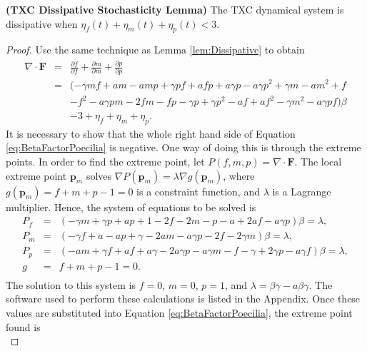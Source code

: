 	\begin{lemma}\label{lem:DissipativePoecilia} \textbf{(TXC Dissipative Stochasticity Lemma)}
		The TXC dynamical system is dissipative when $\eta_f(t)+\eta_m(t)+\eta_p(t)<3$.
	\end{lemma}
	\begin{proof} 
	Use the same technique as Lemma \ref{lem:Dissipative} to obtain	
	\begin{eqnarray}
		 \nabla \cdot \textbf{F}&=&\frac{\partial\dot{f}}{\partial f}+\frac{\partial \dot{m}}{\partial m}+\frac{\partial\dot{p}}{\partial p}\nonumber\\
		 												&=& (-{\gamma}mf+am-amp+{\gamma}pf+afp+a{\gamma}p-a{\gamma}{p}^{2}+{\gamma}m-a{m}^{2}+f\nonumber\\
 														& & -{f}^{2}-a{\gamma}pm-2fm-fp-{\gamma}p+{\gamma}{p}^{2}-af+a{f}^{2}-{\gamma}{m}^{2}-a{\gamma}pf)\beta\nonumber\\
 														& & -3+\eta_f+\eta_m+\eta_p. \label{eq:BetaFactorPoecilia} 
	\end{eqnarray}	
	It is necessary to show that the whole right hand side of Equation \ref{eq:BetaFactorPoecilia} is negative. One way of doing this is through the extreme points. In order to find the extreme point, let $P(f,m,p)=\nabla \cdot \textbf{F}$. The local extreme point $\textbf{p}_m$ solves $\nabla P(\textbf{p}_m) = \lambda \nabla g(\textbf{p}_m)$, where  $g(\textbf{p}_m) = f + m + p - 1 = 0$ is a constraint function, and $\lambda$ is a Lagrange multiplier. Hence, the system of equations to be solved is 
	{\allowdisplaybreaks
	\begin{eqnarray*}
		 P_f & = & \left( -{\gamma}m+{\gamma}p+ap+1-2f-2m-p-a+2af-a{\gamma}p \right) \beta=\lambda,  \\
		 P_m & = & \left( -{\gamma}f+a-ap+{\gamma}-2am-a{\gamma}p-2f-2{\gamma}m \right) \beta=\lambda, \\
		 P_p & = & \left( -am+{\gamma}f+af+a{\gamma}-2a{\gamma}p-a{\gamma}m-f-{\gamma}+2{\gamma}p-a{\gamma}f \right) \beta=\lambda,  \\
		 g & = & f + m + p - 1 = 0.  \\
	\end{eqnarray*}
	}
	The solution to this system is $f=0$, $m=0$, $p=1$, and $\lambda=\beta\gamma-a\beta\gamma$. The software used to perform these calculations is listed in the Appendix. Once these values are substituted into Equation \ref{eq:BetaFactorPoecilia}, the extreme point found is
	\[
\]
\end{proof}
